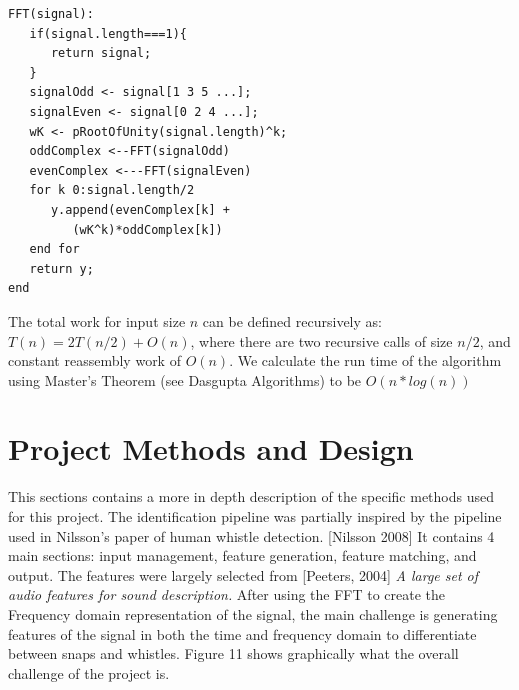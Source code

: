 \documentclass[DIV=calc, paper=a4, fontsize=11pt, twocolumn]{scrartcl}   %
\begin{document}
\begin{lstlisting}
FFT(signal):
   if(signal.length===1){
      return signal;
   }
   signalOdd <- signal[1 3 5 ...];
   signalEven <- signal[0 2 4 ...];
   wK <- pRootOfUnity(signal.length)^k;
   oddComplex <--FFT(signalOdd)
   evenComplex <---FFT(signalEven)
   for k 0:signal.length/2
      y.append(evenComplex[k] +
         (wK^k)*oddComplex[k])
   end for
   return y;
end
\end{lstlisting}

 The total work for input size $n$ can be defined recursively as: $T(n) = 2T(n/2)+O(n)$, where there are two recursive calls of size $n/2$, and constant reassembly work of $O(n)$. We calculate the run time of the algorithm using Master's Theorem (see Dasgupta Algorithms) to be $O(n*log(n))$

\section{Project Methods and Design}
   This sections contains a more in depth description of the specific methods used for this project.
   The identification pipeline was partially inspired by the pipeline used in Nilsson's paper of human whistle detection. [Nilsson 2008] It contains 4 main sections: input management, feature generation, feature matching, and output. The features were largely selected from [Peeters, 2004] \textit{A large set of audio features for sound description.} After using the FFT to create the Frequency domain representation of the signal, the main challenge is generating features of the signal in both the time and frequency domain to differentiate between snaps and whistles. Figure 11 shows graphically what the overall challenge of the project is.
\end{document}
